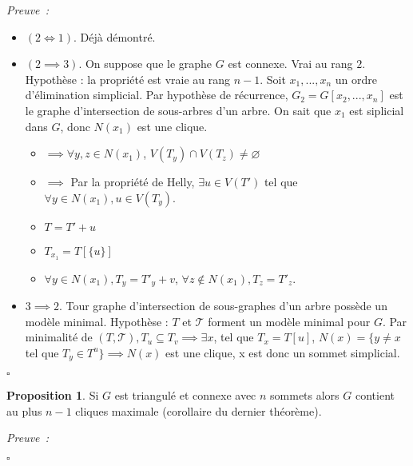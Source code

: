 \documentclass{book}
\theoremstyle{definition}
\newtheorem{proposition}{Proposition}
\numberwithin{lemma}{subsection}
\numberwithin{theorem}{subsection}
\numberwithin{definition}{subsection}
\numberwithin{proposition}{subsection}
\numberwithin{corollary}{subsection}
\numberwithin{property}{subsection}
\numberwithin{example}{subsection}
\numberwithin{heuristique}{subsection}
\numberwithin{scenario}{subsection}
\newenvironment{proofi} {\noindent\emph{Preuve~:}} {\hfill $\square$\vspace{0.2cm}}
\begin{document}
\begin{proofi}
\begin{itemize}
    \item $(2 \iff 1)$. Déjà démontré.
    \item $(2 \implies 3)$. On suppose que le graphe $G$ est connexe. Vrai au rang $2$. Hypothèse : la propriété est vraie au rang $n - 1$. Soit $x_1, ..., x_n$ un ordre d'élimination simplicial. Par hypothèse de récurrence, $G_2 = G[x_2, ..., x_n]$ est le graphe d'intersection de sous-arbres d'un arbre. On sait que $x_1$ est siplicial dans $G$, donc $N(x_1)$ est une clique.
    \begin{itemize}
        \item $ \implies \forall y, z \in N(x_1)$, $V(T_y) \cap V(T_z) \neq \varnothing$
        \item $\implies $ Par la propriété de Helly, $\exists u \in V(T')$ tel que $\forall y \in N(x_1), u \in V(T_y)$.
    \end{itemize}
    \begin{itemize}
        \item $T = T' + u$
        \item $T_{x_1} = T[\{ u \}]$
        \item $\forall y \in N(x_1), T_y = T'_y + v$, $\forall z \notin N(x_1), T_z = T'_z$.
    \end{itemize}
    \item $3 \implies 2$. Tour graphe d'intersection de sous-graphes d'un arbre possède un modèle minimal. Hypothèse : $T$ et $\mathcal{T}$ forment un modèle minimal pour $G$. Par minimalité de $(T, \mathcal{T}), T_u \subseteq T_v \implies \exists x$, tel que $T_x = T[u]$, $N(x) = \{ y \neq x$ tel que $T_y \in T^u \} \implies N(x)$ est une clique, x est donc un sommet simplicial. %
\end{itemize}
\end{proofi}

\begin{proposition}
Si $G$ est triangulé et connexe avec $n$ sommets alors $G$ contient au plus $n-1$ cliques maximale (corollaire du dernier théorème).
\end{proposition}

\begin{proofi}

\end{proofi}
\end{document}
